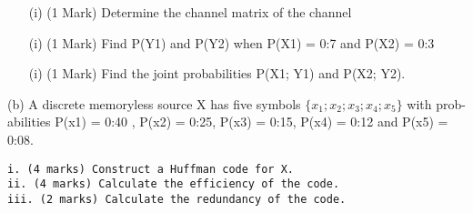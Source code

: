 \documentclass[]{article}
\begin{document}
\begin{itemize}
\item[(i)] (1 Mark) Determine the channel matrix of the channel
\item[(i)] (1 Mark)  Find P(Y1) and P(Y2) when P(X1) = 0:7 and P(X2) = 0:3
\item[(i)] (1 Mark)  Find the joint probabilities P(X1; Y1) and P(X2; Y2).
\end{itemize}
(b) A discrete memoryless source X has five symbols $\{x_1; x_2; x_3; x_4; x_5\}$ with prob-
abilities P(x1) = 0:40 , P(x2) = 0:25, P(x3) = 0:15, P(x4) = 0:12 and
P(x5) = 0:08.
\begin{verbatim}
i. (4 marks) Construct a Huffman code for X.
ii. (4 marks) Calculate the efficiency of the code.
iii. (2 marks) Calculate the redundancy of the code.
\end{verbatim}
\end{document}
